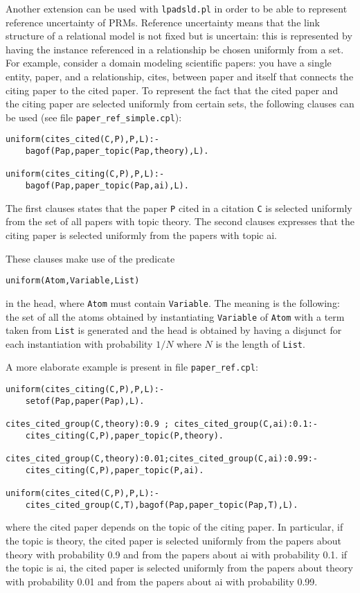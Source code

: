 \documentclass[a4paper,12pt]{article}
\begin{document}
Another extension can be used with \texttt{lpadsld.pl} in order to be able to represent  reference uncertainty of PRMs. Reference uncertainty means that the link structure of a relational model is not fixed but is uncertain: this is represented by having the instance referenced in a relationship be chosen uniformly from a set. For example, consider a domain modeling scientific papers: you have a single entity, paper, and a relationship, cites, between paper and itself that connects the citing paper to the cited paper. To represent the fact that the cited paper and the citing paper are selected uniformly from certain sets, the following clauses can be used (see file \verb|paper_ref_simple.cpl|):
\begin{verbatim}
uniform(cites_cited(C,P),P,L):-
    bagof(Pap,paper_topic(Pap,theory),L).

uniform(cites_citing(C,P),P,L):-
    bagof(Pap,paper_topic(Pap,ai),L).
\end{verbatim}
The first clauses states that the  paper \texttt{P} cited in a citation \texttt{C} is selected uniformly from the set of all papers with topic theory.
The second clauses expresses that the citing paper is selected uniformly from the papers with
topic ai.

These clauses make use of the predicate
\begin{verbatim}
uniform(Atom,Variable,List)
\end{verbatim}
in the head, where \texttt{Atom} must contain \texttt{Variable}. The meaning is the following: the set of all the atoms obtained by instantiating \texttt{Variable} of \texttt{Atom} with a term taken from \texttt{List} is generated and the head is obtained by having a disjunct for each instantiation with probability $1/N$ where $N$ is the length of \texttt{List}.


A more elaborate example is present in file \verb|paper_ref.cpl|:
\begin{verbatim}
uniform(cites_citing(C,P),P,L):-
    setof(Pap,paper(Pap),L).

cites_cited_group(C,theory):0.9 ; cites_cited_group(C,ai):0.1:-
    cites_citing(C,P),paper_topic(P,theory).

cites_cited_group(C,theory):0.01;cites_cited_group(C,ai):0.99:-
    cites_citing(C,P),paper_topic(P,ai).

uniform(cites_cited(C,P),P,L):-
    cites_cited_group(C,T),bagof(Pap,paper_topic(Pap,T),L).
\end{verbatim}
where the cited paper depends on the topic of the citing paper. In particular, if the topic is theory, the cited paper is selected uniformly  from the papers about theory with probability 0.9 and from the papers about ai with probability 0.1. if the topic is ai, the cited paper is selected uniformly  from the papers about theory with probability 0.01 and from the papers about ai with probability 0.99.
\end{document}
